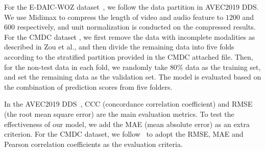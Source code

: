\documentclass{article}
\begin{document}
For the E-DAIC-WOZ dataset~\cite{AVEC2019,DAIC}, we follow the data partition in AVEC2019 DDS. We use Midimax to compress the length of video and audio feature to $1200$ and $600$ respectively, and unit normalization is conducted on the compressed results.
For the CMDC dataset \cite{CMDC}, we first remove the data with incomplete modalities as described in Zou et al.\cite{CMDC}, and then divide the remaining data into five folds according to the stratified partition provided in the CMDC attached file. Then, for the non-test data in each fold, we randomly take $80\%$ data as the training set, and set the remaining data as the validation set. The model is evaluated based on the combination of prediction scores from five folders.

In the AVEC2019 DDS~\cite{AVEC2019}, CCC (concordance correlation coefficient) and RMSE (the root mean square error) are the main evaluation metrics. To test the effectiveness of our model, we add the MAE (mean absolute error) as an extra criterion.
For the CMDC dataset, we follow~\cite{CMDC} to adopt the RMSE, MAE and Pearson correlation coefficients as the evaluation criteria.


\end{document}
